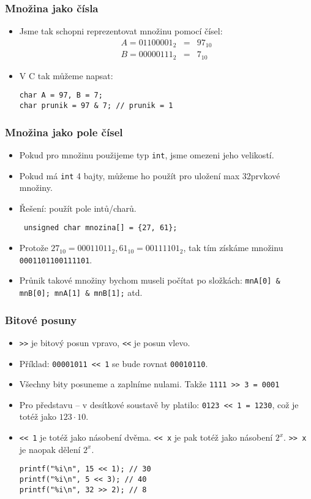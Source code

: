 \documentclass{beamer}
\newenvironment{itemizex}%
  {\large \begin{itemize}%
    \setlength{\itemsep}{8pt}%
    \setlength{\parskip}{8pt}}%
  {\end{itemize}}
\newenvironment{itemizey}%
  {\large \begin{itemize}%
    \setlength{\itemsep}{6pt}%
    \setlength{\parskip}{6pt}}%
  {\end{itemize}}
\begin{document}
\begin{frame}[t,fragile]\frametitle{Množina jako čísla} 
    \begin{itemizex}
        \item Jsme tak schopni reprezentovat množinu pomocí čísel:
\begin{eqnarray*}
A = 01100001_2 &=&  97_{10}\\
B = 00000111_2 &=& 7_{10}
\end{eqnarray*}
        \item V C tak můžeme napsat:
\begin{verbatim} 
char A = 97, B = 7;
char prunik = 97 & 7; // prunik = 1
\end{verbatim}
    \end{itemizex}
\end{frame}


\begin{frame}[t,fragile]\frametitle{Množina jako pole čísel} 
    \begin{itemizey}
        \item Pokud pro množinu použijeme typ \texttt{int}, jsme omezeni jeho velikostí.
        \item Pokud má \texttt{int} 4 bajty, můžeme ho použít pro uložení max 32prvkové množiny. 
        \item Řešení: použít pole intů/charů. 
\begin{verbatim} 
 unsigned char mnozina[] = {27, 61};
 \end{verbatim} 
        \item Protože $27_{10}=00011011_2, 61_{10}= 00111101_2$, tak tím získáme množinu \texttt{0001101100111101}.
        \item Průnik takové množiny bychom museli počítat po složkách: \texttt{mnA[0] \& mnB[0]; mnA[1] \& mnB[1];} atd. 
    \end{itemizey}
\end{frame}


\begin{frame}[t,fragile]\frametitle{Bitové posuny} 
    \begin{itemize}
        \item \texttt{>>} je bitový posun vpravo, \texttt{<<} je posun vlevo. 
        \item Příklad: \texttt{00001011 << 1} se bude rovnat \texttt{00010110}.
        \item Všechny bity posuneme a  zaplníme nulami. Takže \texttt{1111 >> 3 = 0001}
        \item Pro představu -- v desítkové soustavě by platilo: \texttt{0123 << 1 = 1230}, což je totéž jako $123 \cdot 10$.
        \item \texttt{<< 1} je totéž jako násobení dvěma. \texttt{<< x} je pak totéž jako násobení $2^x$. \texttt{>> x} je naopak dělení $2^x$.
\begin{verbatim} 
printf("%i\n", 15 << 1); // 30
printf("%i\n", 5 << 3); // 40
printf("%i\n", 32 >> 2); // 8
\end{verbatim}
    \end{itemize}
\end{frame}
\end{document}
